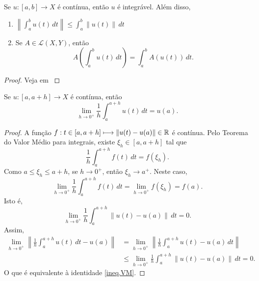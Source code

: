 \begin{proposition}\label{KthA3.2}
Se $u:[a,b]\longrightarrow X$ é {contínua}, então $u$ é integrável. Além disso, 
\begin{enumerate}
    \item $\displaystyle\left\|\int_a^b u(t)\,dt\right\|\leq \int_a^b \|u(t)\|\,dt$
    \item Se $A\in \mathcal{L}(X,Y)$, então
    \[ A\left(\int_a^b u(t)\,dt\right)=\int_a^b A(u(t))\,dt. \]
\end{enumerate}
\end{proposition}
\begin{proof}
Veja em \cite[Theorem A3.2]{kesavan2015topics}
\end{proof}

\begin{proposition}\label{Prop.VM}
Se $u:[a,a+h]\longrightarrow X$ é {contínua}, então
\begin{equation}\label{ineq.VM}
\lim\limits_{h\to 0^+} \frac{1}{h}\int_a^{a+h} u(t)\,dt = u(a).
\end{equation}
\end{proposition}
\begin{proof}
A função  $f:t\in [a,a+h]\longmapsto \|u(t)-u(a)\|\in \mathbb{R}$ é contínua. Pelo Teorema do Valor Médio para integrais, existe $\xi_h\in [a,a+h]$ tal que 
\[
\frac{1}{h}\int_a^{a+h} f(t)\,dt=f(\xi_h).
\]
Como $a\leq \xi_h\leq a+h$, se $h\to 0^+$, então $\xi_h\to a^+$. Neste caso, 
\[
\lim_{h\to 0^+}\frac{1}{h}\int_a^{a+h} f(t)\,dt=\lim_{h\to 0^+}f(\xi_h)=f(a).
\]
Isto é, 
\begin{equation*}
\lim_{h\to 0^+}\frac{1}{h}\int_a^{a+h} \|u(t)-u(a)\|\,dt=0.
\end{equation*}
Assim, 
\begin{align*}
\lim_{h\to 0^+}\left\|\frac{1}{h}\int_a^{a+h} u(t)\,dt -u(a)\right\|& =
\lim_{h\to 0^+}\left\|\frac{1}{h}\int_a^{a+h} u(t)-u(a)\,dt\right\|\\
&\leq \lim_{h\to 0^+}\frac{1}{h}\int_a^{a+h}\left\| u(t)-u(a)\right\|\,dt
=0.
\end{align*}
O que é equivalente à identidade \eqref{ineq.VM}.
\end{proof}